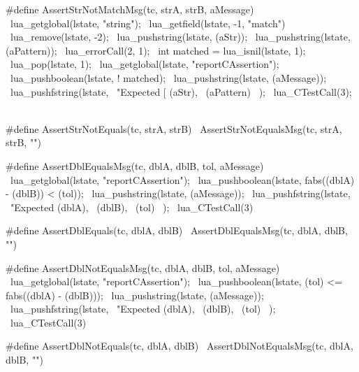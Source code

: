 \startCHeader
#define AssertStrNotMatchMsg(tc, strA, strB, aMessage) \
{                                                      \
  lua_getglobal(lstate, "string");                     \
  lua_getfield(lstate, -1, "match")                    \
  lua_remove(lstate, -2);                              \
  lua_pushstring(lstate, (aStr));                      \
  lua_pushstring(lstate, (aPattern));                  \
  lua_errorCall(2, 1);                                 \
  int matched = lua_isnil(lstate, 1);                  \
  lua_pop(lstate, 1);                                  \
  lua_getglobal(lstate, "reportCAssertion");           \
  lua_pushboolean(lstate, ! matched);                  \
  lua_pushstring(lstate, (aMessage));                  \
  lua_pushfstring(lstate,                              \
      "Expected [%
      (aStr),                                          \
      (aPattern)                                       \
    );                                                 \
  lua_CTestCall(3);                                    \
}

#define AssertStrNotEquals(tc, strA, strB) \
  AssertStrNotEqualsMsg(tc, strA, strB, "")
\stopCHeader

\stopTestSuite

\startTestSuite[assertDblEquals]

\startCHeader
#define AssertDblEqualsMsg(tc, dblA, dblB, tol, aMessage)    \
  lua_getglobal(lstate, "reportCAssertion");                 \
  lua_pushboolean(lstate, fabs((dblA) - (dblB)) < (tol));    \
  lua_pushstring(lstate, (aMessage));                        \
  lua_pushfstring(lstate,                                    \
      "Expected %
      (dblA),                                                \
      (dblB),                                                \
      (tol)                                                  \
    );                                                       \
  lua_CTestCall(3)

#define AssertDblEquals(tc, dblA, dblB) \
  AssertDblEqualsMsg(tc, dblA, dblB, "")
\stopCHeader

\stopTestSuite

\startTestSuite[assertDblNotEqals]

\startCHeader
#define AssertDblNotEqualsMsg(tc, dblA, dblB, tol, aMessage)     \
  lua_getglobal(lstate, "reportCAssertion");                     \
  lua_pushboolean(lstate, (tol) <= fabs((dblA) - (dblB)));       \
  lua_pushstring(lstate, (aMessage));                            \
  lua_pushfstring(lstate,                                        \
      "Expected %
      (dblA),                                                    \
      (dblB),                                                    \
      (tol)                                                      \
    );                                                           \
  lua_CTestCall(3)

#define AssertDblNotEquals(tc, dblA, dblB) \
  AssertDblNotEqualsMsg(tc, dblA, dblB, "")
\stopCHeader

\stopTestSuite
